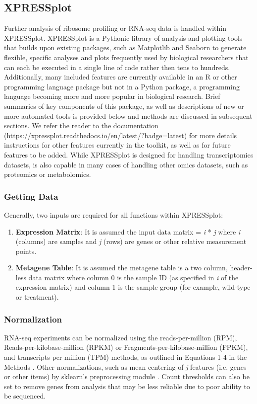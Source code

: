 \documentclass[11pt, a4paper, oneside]{article}
\begin{document}
\subsection{XPRESSplot}
Further analysis of ribosome profiling or RNA-seq data is handled within XPRESSplot. XPRESSplot is a Pythonic library of analysis and plotting tools that builds upon existing packages, such as Matplotlib \cite{matplotlib} and Seaborn \cite{seaborn} to generate flexible, specific analyses and plots frequently used by biological researchers that can each be executed in a single line of code rather then tens to hundreds. Additionally, many included features are currently available in an R or other programming language package but not in a Python package, a programming language becoming more and more popular in biological research. Brief summaries of key components of this package, as well as descriptions of new or more automated tools is provided below and methods are discussed in subsequent sections. We refer the reader to the documentation (https://xpressplot.readthedocs.io/en/latest/?badge=latest) for more details instructions for other features currently in the toolkit, as well as for future features to be added. While XPRESSplot is designed for handling transcriptomics datasets, is also capable in many cases of handling other omics datasets, such as proteomics or metabolomics.

\subsubsection{Getting Data}
Generally, two inputs are required for all functions within XPRESSplot:

\begin{enumerate}
  \item \textbf{Expression Matrix}: It is assumed the input data matrix = \textit{i} * \textit{j} where \textit{i} (columns) are samples and \textit{j} (rows) are genes or other relative measurement points.
  \item \textbf{Metagene Table}: It is assumed the metagene table is a two column, header-less data matrix where column 0 is the sample ID (as specified in \textit{i} of the expression matrix) and column 1 is the sample group (for example, wild-type or treatment).
\end{enumerate}

\subsubsection{Normalization}
RNA-seq experiments can be normalized using the reads-per-million (RPM), Reads-per-kilobase-million (RPKM) or Fragments-per-kilobase-million (FPKM), and transcripts per million (TPM) methods, as outlined in Equations 1-4 in the Methods \cite{evans_briefbio}. Other normalizations, such as mean centering of \textit{j} features (i.e. genes or other items) by sklearn's preprocessing module \cite{scikit_learn}. Count thresholds can also be set to remove genes from analysis that may be less reliable due to poor ability to be sequenced.
\end{document}
